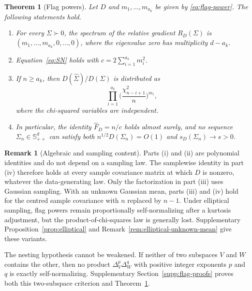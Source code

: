 \documentclass[12pt,a4paper]{article}
\theoremstyle{plain}
\newtheorem{theorem}{Theorem}
\theoremstyle{definition}
\newtheorem{remark}{Remark}
\newcommand{\Smat}{\mathbb{S}}
\newcommand{\Sighat}{\hat{\Sigma}}
\newcommand{\FD}{\widehat{F}_D}
\begin{document}
\begin{theorem}[Flag powers]
\label{thm:flag}
    Let $D$ and $m_1,\ldots,m_{a_k}$ be given by \eqref{eq:flag-power}.
    The following statements hold.
    \begin{enumerate}
        \item[(i)] For every $\Sigma\succ0$, the spectrum of the relative gradient $R_D(\Sigma)$ is $(m_1,\ldots,m_{a_k},0,\ldots,0)$, where the eigenvalue zero has multiplicity $d-a_k$.
        \item[(ii)] Equation~\eqref{eq:SN} holds with $c=2\sum_{i=1}^{a_k}m_i^2$.
        \item[(iii)] If $n\ge a_k$, then $D(\Sighat)/D(\Sigma)$ is distributed as
        \begin{equation}
        \label{eq:wishart-pivot}
            \prod_{i=1}^{a_k}\Biggl(
                \frac{\chi^2_{n-i+1}}{n}
            \Biggr)^{m_i}
            ,
        \end{equation}
        where the chi-squared variables are independent.
        \item[(iv)] In particular, the identity $\FD=n/c$ holds almost surely, and no sequence $\Sigma_n\in\Smat^d_{++}$ can satisfy both $n^{1/2}D(\Sigma_n)=O(1)$ and $s_D(\Sigma_n)\to s>0$.
    \end{enumerate}
\end{theorem}

\begin{remark}[Algebraic and sampling content]
\label{rem:flag-scope}
    Parts (i) and (ii) are polynomial identities and do not depend on a sampling law.
    The samplewise identity in part (iv) therefore holds at every sample covariance matrix at which $D$ is nonzero, whatever the data-generating law.
    Only the factorization in part (iii) uses Gaussian sampling.
    With an unknown Gaussian mean, parts (iii) and (iv) hold for the centred sample covariance with $n$ replaced by $n-1$.
    Under elliptical sampling, flag powers remain proportionally self-normalizing after a kurtosis adjustment, but the product-of-chi-squares law is generally lost.
    Supplementary Proposition~\ref{prop:elliptical} and Remark~\ref{rem:elliptical-unknown-mean} give these variants.
\end{remark}

The nesting hypothesis cannot be weakened.
If neither of two subspaces $V$ and $W$ contains the other, then no product $\Delta_V^p\Delta_W^q$ with positive integer exponents $p$ and $q$ is exactly self-normalizing.
Supplementary Section~\ref{supp:flag-proofs} proves both this two-subspace criterion and Theorem~\ref{thm:flag}.
\end{document}
